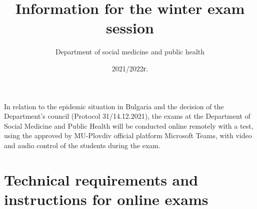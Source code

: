 \documentclass[13pt,a4paper]{article}
\begin{document}
	\title{ Information for the winter exam session }
	\date{2021/2022г.}
	\author{ Department of social medicine and public health}
	\maketitle
In relation to the epidemic situation in Bulgaria and the decision of the Department's council (Protocol 31/14.12.2021), the exams at the Department of Social Medicine and Public Health will be conducted online remotely with a test, using the approved by MU-Plovdiv official platform Microsoft Teams, with video and audio control of the students during the exam.

	\thispagestyle{fancy}
	
	\section*{Technical requirements and instructions for online exams} 
\end{document}

